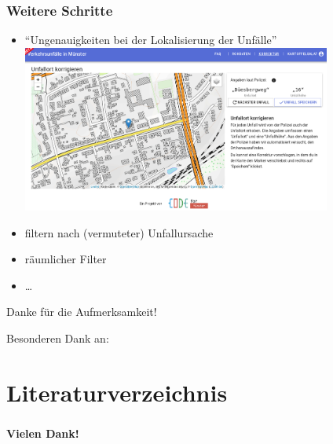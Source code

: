 \documentclass{beamer}
\begin{document}
\begin{frame}
  \frametitle{Weitere Schritte}
  
  \centering  
  
  \begin{itemize}
    \item "`Ungenauigkeiten bei der Lokalisierung der Unfälle"' \cite[S.~38]{Baier2018}
    \includegraphics[width=0.8\textwidth]{img/editor-screenshot.png}
    \item filtern nach (vermuteter) Unfallursache
    \item räumlicher Filter
    \item \ldots
  \end{itemize}
\end{frame}

\begin{frame}
  Danke für die Aufmerksamkeit!
  
  Besonderen Dank an:

\end{frame}

\section{Literaturverzeichnis}
\begin{frame}[plain]%
  \frametitle{\secname{}} %
	\begin{center}
		\LARGE\textbf{Vielen Dank!}
	\end{center}
	
		
	
\end{frame}

\setcounter{finalframe}{\value{framenumber}}
\appendix
\begin{frame}
\end{frame}
\setcounter{framenumber}{\value{finalframe}}
\end{document}
